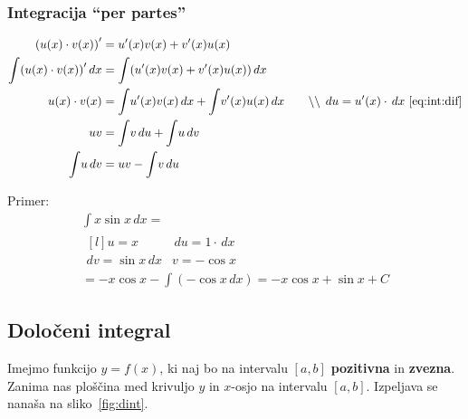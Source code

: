 \documentclass[a4paper,oneside,12pt,fleqn]{article}
\newcommand\krat\cdot
\newcommand{\comment}[1]{\ensuremath{\qquad\backslash\backslash\;}\textnormal{#1}}
\def\kos{\cos}
\renewcommand{\d}{\ensuremath{\,d}} %
\newcommand{\dx}{\ensuremath{\d x}}
\newcommand{\du}{\ensuremath{\d u}}
\newcommand{\dv}{\ensuremath{\d v}}
\numberwithin{equation}{section}
\begin{document}
\subsubsection{Integracija ``per partes''}
\label{sec:int:perpartes}
\begin{align}
  \left( u(x)\krat v(x) \right)' &= u'(x)v(x) + v'(x)u(x) \nonumber \\
  \int\!\left( u(x)\krat v(x) \right)'\!\dx &= \int\!\left( u'(x)v(x) + v'(x)u(x)
  \right)\!\dx \nonumber \\
  u(x)\krat v(x) &= \int\!u'(x)v(x)\dx + \int\!v'(x)u(x)\dx \comment{$\du = u'(x)\krat
  \dx$ \eqref{eq:int:dif}} \nonumber \\
  uv &= \int\!v\du + \int\!u\dv \nonumber \\
  \int\!u\dv &= uv - \int\!v\du \label{eq:int:perpartes}
\end{align}

Primer:
\begin{gather*}
  \int\!x\sin x\dx = \\
  \begin{matrix*}[l]
    u = x & \du = 1\krat\dx \\
    dv = \sin x\dx & v = -\kos x
  \end{matrix*} \\
  = -x\kos x - \int\!(-\kos x\dx) = -x\kos x + \sin x + C
\end{gather*}

\subsection{Določeni integral}
\label{sec:dint}
Imejmo funkcijo $y = f(x)$, ki naj bo na intervalu $[a,b]$ \textbf{pozitivna} in
\textbf{zvezna}. Zanima nas ploščina med krivuljo $y$ in $x$-osjo na intervalu $[a,b]$.
Izpeljava se nanaša na sliko~\ref{fig:dint}.
\end{document}
